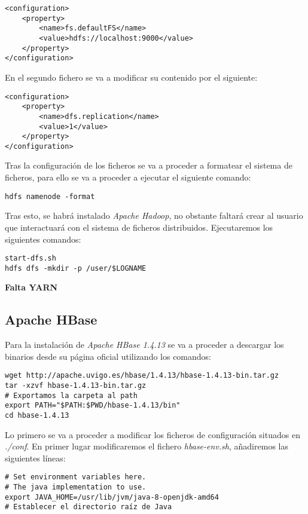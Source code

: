 \documentclass[11pt,a4paper]{article}
\begin{document}
\begin{lstlisting}
<configuration>
    <property>
        <name>fs.defaultFS</name>
        <value>hdfs://localhost:9000</value>
    </property>
</configuration>
\end{lstlisting}

En el segundo fichero se va a modificar su contenido por el siguiente:

\begin{lstlisting}
<configuration>
    <property>
        <name>dfs.replication</name>
        <value>1</value>
    </property>
</configuration>
\end{lstlisting}

Tras la configuración de los ficheros se va a proceder a formatear el sistema de ficheros, para ello se va a proceder a ejecutar el siguiente comando:

\begin{lstlisting}
hdfs namenode -format
\end{lstlisting}

Tras esto, se habrá instalado \emph{Apache Hadoop}, no obstante faltará crear al usuario que interactuará con el sistema de ficheros distribuidos. Ejecutaremos los siguientes comandos:

\begin{lstlisting}
start-dfs.sh
hdfs dfs -mkdir -p /user/$LOGNAME
\end{lstlisting}


\textbf{{\Huge Falta YARN}}

\subsection{Apache HBase}

Para la instalación de \emph{Apache HBase 1.4.13} se va a proceder a descargar los binarios desde su página oficial utilizando los comandos:

\begin{lstlisting}
wget http://apache.uvigo.es/hbase/1.4.13/hbase-1.4.13-bin.tar.gz
tar -xzvf hbase-1.4.13-bin.tar.gz
# Exportamos la carpeta al path
export PATH="$PATH:$PWD/hbase-1.4.13/bin" 
cd hbase-1.4.13
\end{lstlisting}

Lo primero se va a proceder a modificar los ficheros de configuración situados en \emph{./conf}. En primer lugar modificaremos el fichero \emph{hbase-env.sh}, añadiremos las siguientes líneas:

\begin{lstlisting}
# Set environment variables here.
# The java implementation to use.
export JAVA_HOME=/usr/lib/jvm/java-8-openjdk-amd64
# Establecer el directorio raíz de Java
\end{lstlisting}
\end{document}
